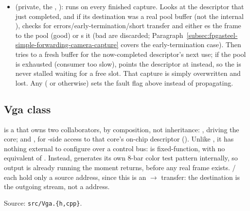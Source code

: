 \begin{itemize}
    \item {} (private, the , ): runs on every finished capture. Looks at the descriptor that just completed, and if its destination was a real pool buffer (not the internal ), checks for  errors/early-termination/short transfer and either es the frame to the pool (good) or s it (bad are discarded; Paragraph~\ref{subsec:fpgasteel-simple-forwarding-camera-capture} covers the early-termination case). Then tries to  a fresh buffer for the now-completed descriptor's next use; if the pool is exhausted (consumer too slow), points the descriptor at  instead, so the  is never stalled waiting for a free slot. That capture is simply overwritten and lost. Any  ( or otherwise) sets the fault flag above instead of propagating.
\end{itemize}

\subsection{Vga class}
\label{subsec:fpgasteel-vga-class}

 is a  that owns two collaborators, by composition, not inheritance: , driving the  core; and , for -side access to that core's on-chip descriptor  (). Unlike , it has nothing external to configure over a control bus:  is fixed-function, with no equivalent of . Instead,  generates its own 8-bar color test pattern internally, so  output is already running the moment  returns, before any real frame exists. / each hold only a source address, since this is an $\rightarrow$ transfer: the destination is the outgoing  stream, not a  address.

Source: \lstinline[style=inlineFsRepo]!src/Vga.{h,cpp}!.

